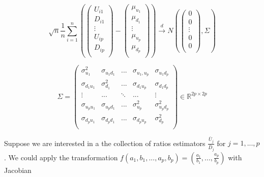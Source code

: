 \documentclass{article}
\theoremstyle{definition}
\begin{document}
\begin{equation*} \sqrt{n} \frac{1}{n}\sum_{i=1}^{n}
    \left(\left(\begin{array}{c}
        U_{i1}  \\
        D_{i1}  \\ 
        \vdots \\ 
        U_{ip}\\
        D_{ip}\\
    \end{array}\right) - \left(\begin{array}{c}
        \mu_{u_1}  \\
        \mu_{d_1}  \\ 
        \vdots \\ 
        \mu_{u_p}  \\
        \mu_{d_p}  \\ 
    \end{array}\right)\right) \xrightarrow{d}
    N\left(\left(\begin{array}{c}
        0  \\
        0  \\
        \vdots \\
        0  \\
        0  \\
    \end{array}\right),\Sigma \right)
\end{equation*}

\begin{equation*}
    \Sigma = \left(\begin{array}{ccccc}
        \sigma_{u_1}^2  & \sigma_{u_1d_1}  & ... & \sigma_{u_1,u_p} & \sigma_{u_1d_p} \\
        \sigma_{d_1u_1} & \sigma_{d_1}^2   &... & \sigma_{d_1u_p} &\sigma_{d_1d_p} \\
        \vdots   & ... & \ddots  & ... & \vdots  \\
        \sigma_{u_pu_1} & \sigma_{u_pd_1} & ... & \sigma_{u_p}^2  & \sigma_{u_pd_p}^2 \\
        \sigma_{d_pu_1} & \sigma_{d_pd_1} & ... & \sigma_{d_pu_p} & \sigma_{d_p}^2 \\
    \end{array}\right) \in \mathbb{R}^{2p\times 2p}
\end{equation*}

Suppose we are interested in a the collection of ratios estimators $\frac{\bar{U}_j}{\bar{D}_j}$ for $j=1,...,p$. We could apply the transformation $f(a_1,b_1,...,a_p,b_p) = \left(\frac{a_1}{b_1},...,\frac{a_p}{b_p}\right)$ with Jacobian
\end{document}
